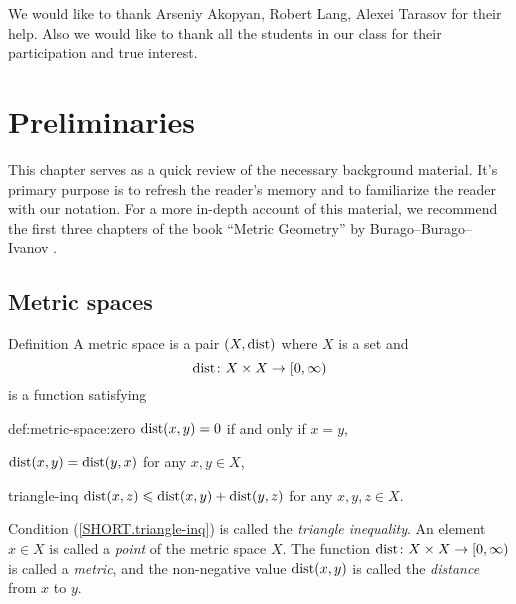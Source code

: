 We would like to thank
Arseniy Akopyan, 
Robert Lang, 
Alexei Tarasov
for their help.
Also we would like to thank all the students in our class
for their participation and true interest.

\tableofcontents

\chapter*{Preliminaries}

This chapter serves as a quick review of the necessary background material.  It's primary purpose is to refresh the reader's memory and to familiarize the reader with our notation.  For a more in-depth account of this material, we recommend the first three chapters of the book
``Metric Geometry'' by Burago--Burago--Ivanov \cite{BBI}.


\section*{Metric spaces}

\begin{thm}{Definition}
\label{def:metric-space}
A metric space is a pair $(X,\operatorname{dist})$ where $X$ is a set and 
$$\operatorname{dist} \colon X \times X \rightarrow [0,\infty)$$
is a function satisfying

\begin{subthm}{def:metric-space:zero}
$\operatorname{dist}(x,y) = 0$ if and only if $x=y$,
\end{subthm}

\begin{subthm}{}
$\operatorname{dist}(x,y) = \operatorname{dist}(y,x)$ for any $x, y \in X$,
\end{subthm}

\begin{subthm}{triangle-inq}
$\operatorname{dist}(x,z)\leqslant \operatorname{dist}(x,y)+\operatorname{dist}(y,z)$ for any $x, y, z \in X$.
\end{subthm}

\end{thm}

Condition (\ref{SHORT.triangle-inq}) is called the \emph{triangle inequality}.
An element $x \in X$ is called a \emph{point} of the metric space $X$.
The function $\operatorname{dist}\colon X \times X \rightarrow [0,\infty)$ is called a \emph{metric}, 
and the non-negative value $\operatorname{dist}(x,y)$ is called the \emph{distance} from $x$ to $y$.

